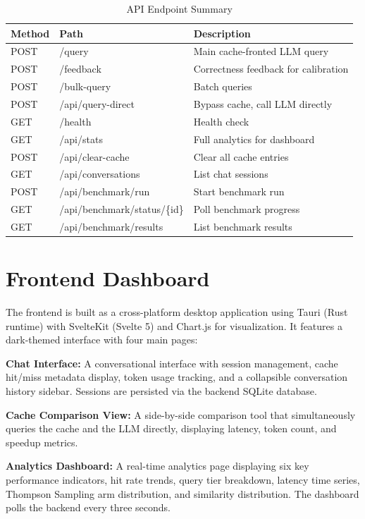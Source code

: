 \documentclass[12pt,a4paper]{report}
\begin{document}
\begin{table}[H]
\centering
\begin{tabular}{lll}
\toprule
\textbf{Method} & \textbf{Path} & \textbf{Description} \\
\midrule
POST & /query & Main cache-fronted LLM query \\
POST & /feedback & Correctness feedback for calibration \\
POST & /bulk-query & Batch queries \\
POST & /api/query-direct & Bypass cache, call LLM directly \\
GET & /health & Health check \\
GET & /api/stats & Full analytics for dashboard \\
POST & /api/clear-cache & Clear all cache entries \\
GET & /api/conversations & List chat sessions \\
POST & /api/benchmark/run & Start benchmark run \\
GET & /api/benchmark/status/\{id\} & Poll benchmark progress \\
GET & /api/benchmark/results & List benchmark results \\
\bottomrule
\end{tabular}
\caption{API Endpoint Summary}
\label{tab:api}
\end{table}

\section{Frontend Dashboard}

The frontend is built as a cross-platform desktop application using Tauri (Rust runtime) with SvelteKit (Svelte 5) and Chart.js for visualization. It features a dark-themed interface with four main pages:

\textbf{Chat Interface:} A conversational interface with session management, cache hit/miss metadata display, token usage tracking, and a collapsible conversation history sidebar. Sessions are persisted via the backend SQLite database.

\textbf{Cache Comparison View:} A side-by-side comparison tool that simultaneously queries the cache and the LLM directly, displaying latency, token count, and speedup metrics.

\textbf{Analytics Dashboard:} A real-time analytics page displaying six key performance indicators, hit rate trends, query tier breakdown, latency time series, Thompson Sampling arm distribution, and similarity distribution. The dashboard polls the backend every three seconds.
\end{document}
